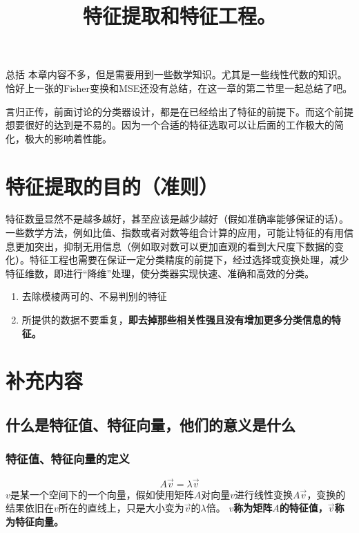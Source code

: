 \documentclass[12pt, letterpaper]{article}
\title{特征提取和特征工程。}
\begin{document}
\maketitle
\tableofcontents

\newpage
总括
本章内容不多，但是需要用到一些数学知识。尤其是一些线性代数的知识。恰好上一张的Fisher变换和MSE还没有总结，在这一章的第二节里一起总结了吧。

言归正传，前面讨论的分类器设计，都是在已经给出了特征的前提下。而这个前提想要很好的达到是不易的。因为一个合适的特征选取可以让后面的工作极大的简化，极大的影响着性能。


\section{特征提取的目的（准则）}
特征数量显然不是越多越好，甚至应该是越少越好（假如准确率能够保证的话）。一些数学方法，例如比值、指数或者对数等组合计算的应用，可能让特征的有用信息更加突出，抑制无用信息（例如取对数可以更加直观的看到大尺度下数据的变化）。特征工程也需要在保证一定分类精度的前提下，经过选择或变换处理，减少特征维数，即进行“降维”处理，使分类器实现快速、准确和高效的分类。

\begin{enumerate}
\item 去除模棱两可的、不易判别的特征
\item 所提供的数据不要重复，\textbf{即去掉那些相关性强且没有增加更多分类信息的特征。}
\end{enumerate}

\section{补充内容}
\subsection{什么是特征值、特征向量，他们的意义是什么}
\subsubsection*{特征值、特征向量的定义}

\begin{equation}
A\vec{v}=\lambda \vec{v}
\end{equation}
$v$是某一个空间下的一个向量，假如使用矩阵$A$对向量$v$进行线性变换$A\vec{v}$，变换的结果依旧在$v$所在的直线上，只是大小变为$\vec{v}$的$\lambda$倍。
\textbf{$v$称为矩阵$A$的特征值，$\vec{v}$称为特征向量。}
\end{document}
